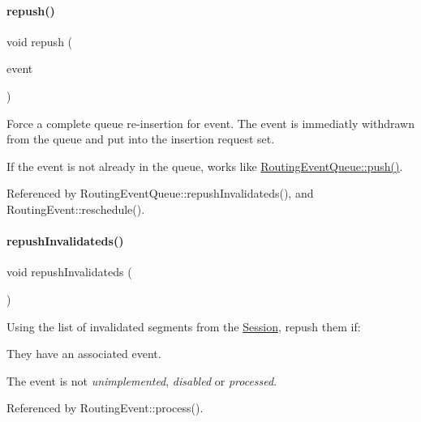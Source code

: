 \paragraph{\texorpdfstring{repush()}{repush()}}
{\footnotesize\ttfamily void repush (\begin{DoxyParamCaption}\item[{\hyperlink{classKite_1_1RoutingEvent}{Routing\+Event} $\ast$}]{event }\end{DoxyParamCaption})}

Force a complete queue re-\/insertion for {\ttfamily event}. The event is immediatly withdrawn from the queue and put into the insertion request set.

If the {\ttfamily event} is not already in the queue, works like \hyperlink{classKite_1_1RoutingEventQueue_ac802427673567526d06af911e94f7216}{Routing\+Event\+Queue\+::push()}. 

Referenced by Routing\+Event\+Queue\+::repush\+Invalidateds(), and Routing\+Event\+::reschedule().

\mbox{\label{classKite_1_1RoutingEventQueue_a4fb0022d3e8f91a862b5f6438b7f8dad}} 
\paragraph{\texorpdfstring{repush\+Invalidateds()}{repushInvalidateds()}}
{\footnotesize\ttfamily void repush\+Invalidateds (\begin{DoxyParamCaption}{ }\end{DoxyParamCaption})}

Using the list of invalidated segments from the \hyperlink{classKite_1_1Session}{Session}, repush them if\+:
\begin{DoxyItemize}
\item They have an associated event.
\item The event is not {\itshape unimplemented}, {\itshape disabled} or {\itshape processed}. 
\end{DoxyItemize}

Referenced by Routing\+Event\+::process().

\mbox{\label{classKite_1_1RoutingEventQueue_ad55316f5135cdae6aa6c5a763f6c3473}} 
